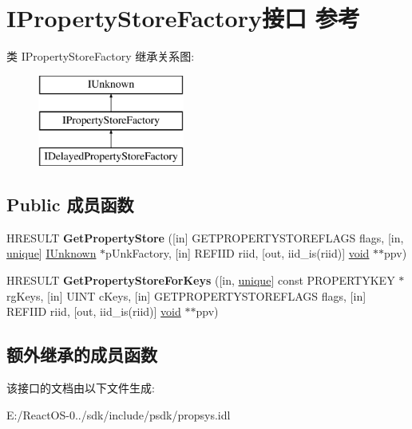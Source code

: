 \hypertarget{interface_i_property_store_factory}{}\section{I\+Property\+Store\+Factory接口 参考}
\label{interface_i_property_store_factory}
类 I\+Property\+Store\+Factory 继承关系图\+:\begin{figure}[H]
\begin{center}
\leavevmode
\includegraphics[height=3.000000cm]{interface_i_property_store_factory}
\end{center}
\end{figure}
\subsection*{Public 成员函数}
\begin{DoxyCompactItemize}
\item 
\mbox{\label{interface_i_property_store_factory_a81e955f8a0adf3bd83f48fda2e108df7}} 
H\+R\+E\+S\+U\+LT {\bfseries Get\+Property\+Store} (\mbox{[}in\mbox{]} G\+E\+T\+P\+R\+O\+P\+E\+R\+T\+Y\+S\+T\+O\+R\+E\+F\+L\+A\+GS flags, \mbox{[}in, \hyperlink{interfaceunique}{unique}\mbox{]} \hyperlink{interface_i_unknown}{I\+Unknown} $\ast$p\+Unk\+Factory, \mbox{[}in\mbox{]} R\+E\+F\+I\+ID riid, \mbox{[}out, iid\+\_\+is(riid)\mbox{]} \hyperlink{interfacevoid}{void} $\ast$$\ast$ppv)
\item 
\mbox{\label{interface_i_property_store_factory_a06917c595a2655f56574263cca9bd864}} 
H\+R\+E\+S\+U\+LT {\bfseries Get\+Property\+Store\+For\+Keys} (\mbox{[}in, \hyperlink{interfaceunique}{unique}\mbox{]} const P\+R\+O\+P\+E\+R\+T\+Y\+K\+EY $\ast$rg\+Keys, \mbox{[}in\mbox{]} U\+I\+NT c\+Keys, \mbox{[}in\mbox{]} G\+E\+T\+P\+R\+O\+P\+E\+R\+T\+Y\+S\+T\+O\+R\+E\+F\+L\+A\+GS flags, \mbox{[}in\mbox{]} R\+E\+F\+I\+ID riid, \mbox{[}out, iid\+\_\+is(riid)\mbox{]} \hyperlink{interfacevoid}{void} $\ast$$\ast$ppv)
\end{DoxyCompactItemize}
\subsection*{额外继承的成员函数}


该接口的文档由以下文件生成\+:\begin{DoxyCompactItemize}
\item 
E\+:/\+React\+O\+S-\/0../sdk/include/psdk/propsys.\+idl\end{DoxyCompactItemize}
